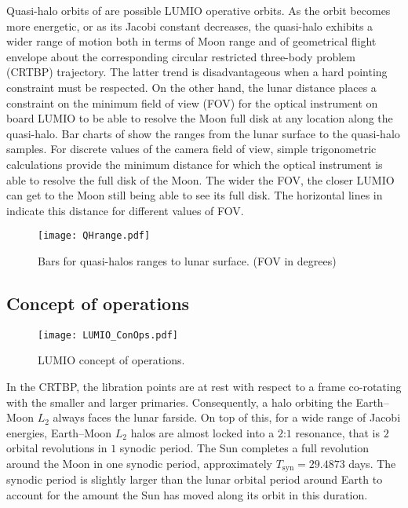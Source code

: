 Quasi-halo orbits of  are possible LUMIO operative orbits. As the orbit becomes more energetic, or as its Jacobi constant decreases, the quasi-halo exhibits a wider range of motion both in terms of Moon range and of geometrical flight envelope about the corresponding circular restricted three-body problem (CRTBP) trajectory. The latter trend is disadvantageous when a hard pointing constraint must be respected. On the other hand, the lunar distance places a constraint on the minimum field of view (FOV) for the optical instrument on board LUMIO to be able to resolve the Moon full disk at any location along the quasi-halo. Bar charts of  show the ranges from the lunar surface to the quasi-halo samples. For discrete values of the camera field of view, simple trigonometric calculations provide the minimum distance for which the optical instrument is able to resolve the full disk of the Moon. The wider the FOV, the closer LUMIO can get to the Moon still being able to see its full disk. The horizontal lines in  indicate this distance for different values of FOV.
%
\begin{figure}[h!]
	\centering
	\texttt{[image: QHrange.pdf]}
	\caption{Bars for quasi-halos ranges to lunar surface. (FOV in degrees)}
	\label{fig:QHranges}
\end{figure}
%


\subsection{Concept of operations}\label{subsec:CONOPS}
%
\begin{figure}[b!]
	\centering
	\texttt{[image: LUMIO\_ConOps.pdf]}
	\caption{LUMIO concept of operations.}
	\label{fig:CONOPS}
\end{figure}
%
In the {CRTBP}, the libration points are at rest with respect to a frame co-rotating with the smaller and larger primaries. Consequently, a halo orbiting the Earth--Moon $L_2$ always faces the lunar farside. On top of this, for a wide range of Jacobi energies, Earth--Moon $L_2$ halos are almost locked into a $2$:$1$ resonance, that is $2$ orbital revolutions in $1$ synodic period. The Sun completes a full revolution around the Moon in one synodic period, approximately $T_{\textrm{syn}} = 29.4873$ days. The synodic period is slightly larger than the lunar orbital period around Earth to account for the amount the Sun has moved along its orbit in this duration.

